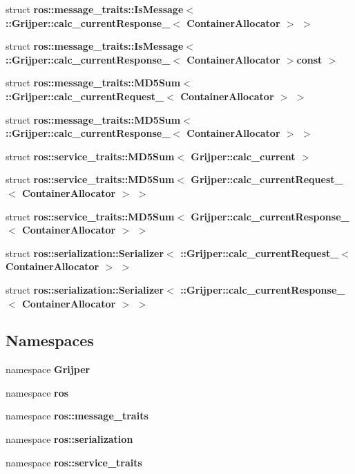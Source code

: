 \begin{DoxyCompactItemize}
\item 
struct {\bf ros\-::message\-\_\-traits\-::\-Is\-Message$<$ \-::\-Grijper\-::calc\-\_\-current\-Response\-\_\-$<$ Container\-Allocator $>$ $>$}
\item 
struct {\bf ros\-::message\-\_\-traits\-::\-Is\-Message$<$ \-::\-Grijper\-::calc\-\_\-current\-Response\-\_\-$<$ Container\-Allocator $>$const  $>$}
\item 
struct {\bf ros\-::message\-\_\-traits\-::\-M\-D5\-Sum$<$ \-::\-Grijper\-::calc\-\_\-current\-Request\-\_\-$<$ Container\-Allocator $>$ $>$}
\item 
struct {\bf ros\-::message\-\_\-traits\-::\-M\-D5\-Sum$<$ \-::\-Grijper\-::calc\-\_\-current\-Response\-\_\-$<$ Container\-Allocator $>$ $>$}
\item 
struct {\bf ros\-::service\-\_\-traits\-::\-M\-D5\-Sum$<$ Grijper\-::calc\-\_\-current $>$}
\item 
struct {\bf ros\-::service\-\_\-traits\-::\-M\-D5\-Sum$<$ Grijper\-::calc\-\_\-current\-Request\-\_\-$<$ Container\-Allocator $>$ $>$}
\item 
struct {\bf ros\-::service\-\_\-traits\-::\-M\-D5\-Sum$<$ Grijper\-::calc\-\_\-current\-Response\-\_\-$<$ Container\-Allocator $>$ $>$}
\item 
struct {\bf ros\-::serialization\-::\-Serializer$<$ \-::\-Grijper\-::calc\-\_\-current\-Request\-\_\-$<$ Container\-Allocator $>$ $>$}
\item 
struct {\bf ros\-::serialization\-::\-Serializer$<$ \-::\-Grijper\-::calc\-\_\-current\-Response\-\_\-$<$ Container\-Allocator $>$ $>$}
\end{DoxyCompactItemize}
\subsection*{Namespaces}
\begin{DoxyCompactItemize}
\item 
namespace {\bf Grijper}
\item 
namespace {\bf ros}
\item 
namespace {\bf ros\-::message\-\_\-traits}
\item 
namespace {\bf ros\-::serialization}
\item 
namespace {\bf ros\-::service\-\_\-traits}
\end{DoxyCompactItemize}
